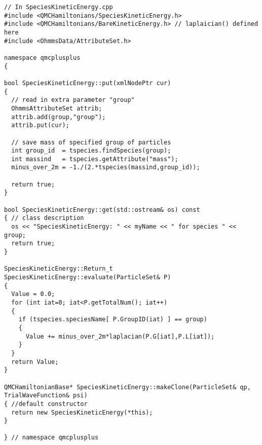 \begin{lstlisting}[style=C++]
// In SpeciesKineticEnergy.cpp
#include <QMCHamiltonians/SpeciesKineticEnergy.h>
#include <QMCHamiltonians/BareKineticEnergy.h> // laplaician() defined here
#include <OhmmsData/AttributeSet.h>

namespace qmcplusplus
{

bool SpeciesKineticEnergy::put(xmlNodePtr cur)
{
  // read in extra parameter "group"
  OhmmsAttributeSet attrib;
  attrib.add(group,"group");
  attrib.put(cur);
  
  // save mass of specified group of particles
  int group_id  = tspecies.findSpecies(group);
  int massind   = tspecies.getAttribute("mass");
  minus_over_2m = -1./(2.*tspecies(massind,group_id)); 

  return true;
}

bool SpeciesKineticEnergy::get(std::ostream& os) const
{ // class description
  os << "SpeciesKineticEnergy: " << myName << " for species " << group;
  return true;
}

SpeciesKineticEnergy::Return_t SpeciesKineticEnergy::evaluate(ParticleSet& P)
{
  Value = 0.0;
  for (int iat=0; iat<P.getTotalNum(); iat++)
  {
    if (tspecies.speciesName[ P.GroupID(iat) ] == group)
    {
      Value += minus_over_2m*laplacian(P.G[iat],P.L[iat]);
    }
  }
  return Value;
}

QMCHamiltonianBase* SpeciesKineticEnergy::makeClone(ParticleSet& qp, TrialWaveFunction& psi)
{ //default constructor
  return new SpeciesKineticEnergy(*this);
}

} // namespace qmcplusplus
\end{lstlisting}

